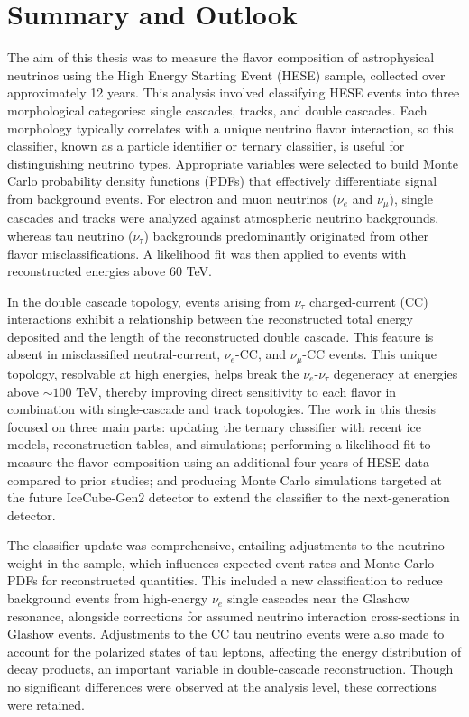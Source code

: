 \setchapterpreamble[u]{\margintoc}
\chapter{Summary and Outlook}

The aim of this thesis was to measure the flavor composition of astrophysical neutrinos using the High Energy Starting Event (HESE) sample, collected over approximately 12 years. This analysis involved classifying HESE events into three morphological categories: single cascades, tracks, and double cascades. Each morphology typically correlates with a unique neutrino flavor interaction, so this classifier, known as a particle identifier or ternary classifier, is useful for distinguishing neutrino types. Appropriate variables were selected to build Monte Carlo probability density functions (PDFs) that effectively differentiate signal from background events. For electron and muon neutrinos ($\nu_e$ and $\nu_\mu$), single cascades and tracks were analyzed against atmospheric neutrino backgrounds, whereas tau neutrino ($\nu_\tau$) backgrounds predominantly originated from other flavor misclassifications. A likelihood fit was then applied to events with reconstructed energies above 60 TeV.

In the double cascade topology, events arising from $\nu_\tau$ charged-current (CC) interactions exhibit a relationship between the reconstructed total energy deposited and the length of the reconstructed double cascade. This feature is absent in misclassified neutral-current, $\nu_e$-CC, and $\nu_\mu$-CC events. This unique topology, resolvable at high energies, helps break the $\nu_e$-$\nu_\tau$ degeneracy at energies above $\sim 100$ TeV, thereby improving direct sensitivity to each flavor in combination with single-cascade and track topologies. The work in this thesis focused on three main parts: updating the ternary classifier with recent ice models, reconstruction tables, and simulations; performing a likelihood fit to measure the flavor composition using an additional four years of HESE data compared to prior studies; and producing Monte Carlo simulations targeted at the future IceCube-Gen2 detector to extend the classifier to the next-generation detector.

The classifier update was comprehensive, entailing adjustments to the neutrino weight in the sample, which influences expected event rates and Monte Carlo PDFs for reconstructed quantities. This included a new classification to reduce background events from high-energy $\nu_e$ single cascades near the Glashow resonance, alongside corrections for assumed neutrino interaction cross-sections in Glashow events. Adjustments to the CC tau neutrino events were also made to account for the polarized states of tau leptons, affecting the energy distribution of decay products, an important variable in double-cascade reconstruction. Though no significant differences were observed at the analysis level, these corrections were retained.


